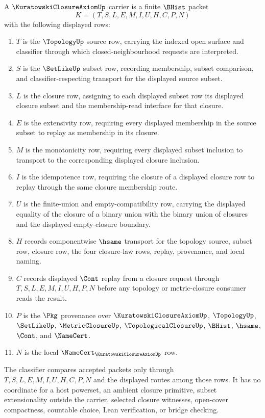 \begin{definition}
\label{def:kuratowski-closure-axiom-carrier}
A $\KuratowskiClosureAxiomUp$ carrier is a finite $\BHist$ packet
$$
K=(T,S,L,E,M,I,U,H,C,P,N)
$$
with the following displayed rows:
\begin{enumerate}
\item $T$ is the $\TopologyUp$ source row, carrying the indexed open surface and classifier through which closed-neighbourhood requests are interpreted.
\item $S$ is the $\SetLikeUp$ subset row, recording membership, subset comparison, and classifier-respecting transport for the displayed source subset.
\item $L$ is the closure row, assigning to each displayed subset row its displayed closure subset and the membership-read interface for that closure.
\item $E$ is the extensivity row, requiring every displayed membership in the source subset to replay as membership in its closure.
\item $M$ is the monotonicity row, requiring every displayed subset inclusion to transport to the corresponding displayed closure inclusion.
\item $I$ is the idempotence row, requiring the closure of a displayed closure row to replay through the same closure membership route.
\item $U$ is the finite-union and empty-compatibility row, carrying the displayed equality of the closure of a binary union with the binary union of closures and the displayed empty-closure boundary.
\item $H$ records componentwise $\hsame$ transport for the topology source, subset row, closure row, the four closure-law rows, replay, provenance, and local naming.
\item $C$ records displayed $\Cont$ replay from a closure request through $T,S,L,E,M,I,U,H,P,N$ before any topology or metric-closure consumer reads the result.
\item $P$ is the $\Pkg$ provenance over $\KuratowskiClosureAxiomUp$, $\TopologyUp$, $\SetLikeUp$, $\MetricClosureUp$, $\TopologicalClosureUp$, $\BHist$, $\hsame$, $\Cont$, and $\NameCert$.
\item $N$ is the local $\NameCert_{\KuratowskiClosureAxiomUp}$ row.
\end{enumerate}
The classifier compares accepted packets only through $T,S,L,E,M,I,U,H,C,P,N$ and the displayed routes among those rows. It has no coordinate for a host powerset, an ambient closure primitive, subset extensionality outside the carrier, selected closure witnesses, open-cover compactness, countable choice, Lean verification, or bridge checking.
\end{definition}

